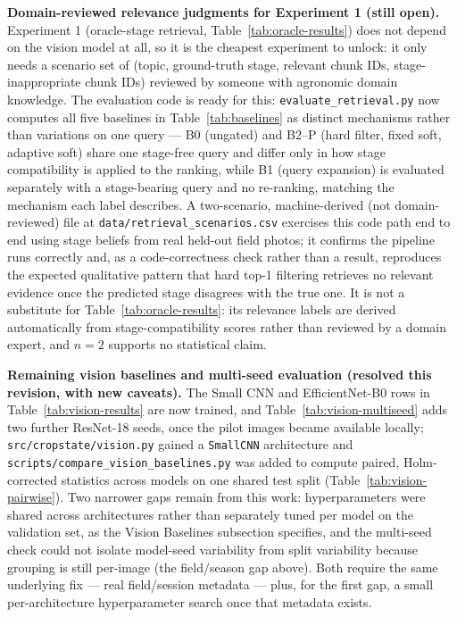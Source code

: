 \documentclass[conference]{IEEEtran}
\begin{document}
\textbf{Domain-reviewed relevance judgments for Experiment 1 (still open).} Experiment 1 (oracle-stage retrieval, Table~\ref{tab:oracle-results}) does not depend on the vision model at all, so it is the cheapest experiment to unlock: it only needs a scenario set of (topic, ground-truth stage, relevant chunk IDs, stage-inappropriate chunk IDs) reviewed by someone with agronomic domain knowledge. The evaluation code is ready for this: \texttt{evaluate\_retrieval.py} now computes all five baselines in Table~\ref{tab:baselines} as distinct mechanisms rather than variations on one query --- B0 (ungated) and B2--P (hard filter, fixed soft, adaptive soft) share one stage-free query and differ only in how stage compatibility is applied to the ranking, while B1 (query expansion) is evaluated separately with a stage-bearing query and no re-ranking, matching the mechanism each label describes. A two-scenario, machine-derived (not domain-reviewed) file at \texttt{data/retrieval\_scenarios.csv} exercises this code path end to end using stage beliefs from real held-out field photos; it confirms the pipeline runs correctly and, as a code-correctness check rather than a result, reproduces the expected qualitative pattern that hard top-1 filtering retrieves no relevant evidence once the predicted stage disagrees with the true one. It is not a substitute for Table~\ref{tab:oracle-results}: its relevance labels are derived automatically from stage-compatibility scores rather than reviewed by a domain expert, and $n=2$ supports no statistical claim.

\textbf{Remaining vision baselines and multi-seed evaluation (resolved this revision, with new caveats).} The Small CNN and EfficientNet-B0 rows in Table~\ref{tab:vision-results} are now trained, and Table~\ref{tab:vision-multiseed} adds two further ResNet-18 seeds, once the pilot images became available locally; \texttt{src/cropstate/vision.py} gained a \texttt{SmallCNN} architecture and \texttt{scripts/compare\_vision\_baselines.py} was added to compute paired, Holm-corrected statistics across models on one shared test split (Table~\ref{tab:vision-pairwise}). Two narrower gaps remain from this work: hyperparameters were shared across architectures rather than separately tuned per model on the validation set, as the Vision Baselines subsection specifies, and the multi-seed check could not isolate model-seed variability from split variability because grouping is still per-image (the field/season gap above). Both require the same underlying fix --- real field/session metadata --- plus, for the first gap, a small per-architecture hyperparameter search once that metadata exists.
\end{document}
